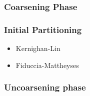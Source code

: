 \documentclass[twocolumn]{el-author}
\begin{document}
\subsubsection{Coarsening Phase}

\subsubsection{Initial Partitioning}
\begin{itemize}
  \item Kernighan-Lin
  \item Fiduccia-Mattheyses
\end{itemize}


\subsubsection{Uncoarsening phase}

%
%
%
%
\end{document}

